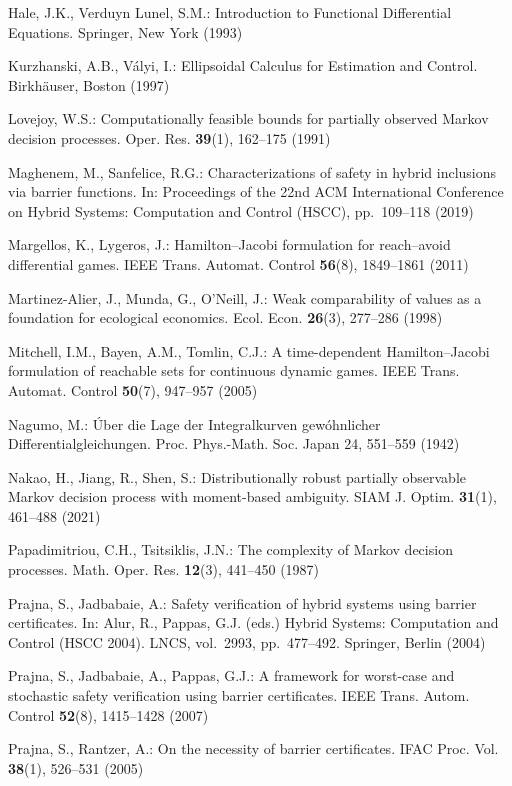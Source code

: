 \documentclass[10pt,twocolumn]{article}
\theoremstyle{definition}
\begin{document}
{Hale, J.K., Verduyn Lunel, S.M.: Introduction to Functional Differential
Equations. Springer, New York (1993)

Kurzhanski, A.B., V\'alyi, I.: Ellipsoidal Calculus for Estimation and
Control. Birkh\"auser, Boston (1997)

Lovejoy, W.S.: Computationally feasible bounds for partially
observed Markov decision processes. Oper. Res. \textbf{39}(1), 162--175
(1991)

Maghenem, M., Sanfelice, R.G.: Characterizations of safety in hybrid
inclusions via barrier functions. In: Proceedings of the 22nd ACM
International Conference on Hybrid Systems: Computation and Control
(HSCC), pp.~109--118 (2019)

Margellos, K., Lygeros, J.: Hamilton--Jacobi formulation for reach--avoid differential games. IEEE Trans. Automat. Control \textbf{56}(8), 1849--1861 (2011)

Martinez-Alier, J., Munda, G., O'Neill, J.: Weak comparability of values
as a foundation for ecological economics. Ecol. Econ. \textbf{26}(3),
277--286 (1998)

Mitchell, I.M., Bayen, A.M., Tomlin, C.J.: A time-dependent Hamilton--Jacobi formulation of reachable sets for continuous dynamic games. IEEE Trans. Automat. Control \textbf{50}(7), 947--957 (2005)

Nagumo, M.: \'Uber die Lage der Integralkurven gew\'ohnlicher
Differentialgleichungen. Proc. Phys.-Math. Soc. Japan 24, 551--559
(1942)

Nakao, H., Jiang, R., Shen, S.: Distributionally robust partially
observable Markov decision process with moment-based ambiguity. SIAM J.
Optim. \textbf{31}(1), 461--488 (2021)

Papadimitriou, C.H., Tsitsiklis, J.N.: The complexity of Markov
decision processes. Math. Oper. Res. \textbf{12}(3), 441--450 (1987)

Prajna, S., Jadbabaie, A.: Safety verification of hybrid systems using
barrier certificates. In: Alur, R., Pappas, G.J. (eds.) Hybrid Systems:
Computation and Control (HSCC 2004). LNCS, vol.~2993, pp.~477--492.
Springer, Berlin (2004)

Prajna, S., Jadbabaie, A., Pappas, G.J.: A framework for worst-case and
stochastic safety verification using barrier certificates. IEEE Trans.
Autom. Control \textbf{52}(8), 1415--1428 (2007)

Prajna, S., Rantzer, A.: On the necessity of barrier certificates. IFAC
Proc. Vol. \textbf{38}(1), 526--531 (2005)

}
\end{document}

